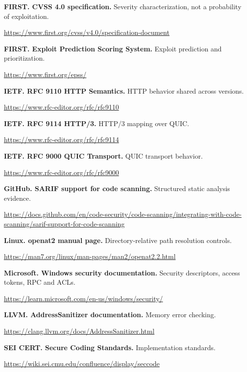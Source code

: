 \documentclass[10pt,letterpaper]{article}
\begin{document}
\noindent\textbf{FIRST. CVSS 4.0 specification.} Severity characterization, not a probability of exploitation.\par\small\url{https://www.first.org/cvss/v4.0/specification-document}\par\normalsize\medskip
\noindent\textbf{FIRST. Exploit Prediction Scoring System.} Exploit prediction and prioritization.\par\small\url{https://www.first.org/epss/}\par\normalsize\medskip
\noindent\textbf{IETF. RFC 9110 HTTP Semantics.} HTTP behavior shared across versions.\par\small\url{https://www.rfc-editor.org/rfc/rfc9110}\par\normalsize\medskip
\noindent\textbf{IETF. RFC 9114 HTTP/3.} HTTP/3 mapping over QUIC.\par\small\url{https://www.rfc-editor.org/rfc/rfc9114}\par\normalsize\medskip
\noindent\textbf{IETF. RFC 9000 QUIC Transport.} QUIC transport behavior.\par\small\url{https://www.rfc-editor.org/rfc/rfc9000}\par\normalsize\medskip
\noindent\textbf{GitHub. SARIF support for code scanning.} Structured static analysis evidence.\par\small\url{https://docs.github.com/en/code-security/code-scanning/integrating-with-code-scanning/sarif-support-for-code-scanning}\par\normalsize\medskip
\noindent\textbf{Linux. openat2 manual page.} Directory-relative path resolution controls.\par\small\url{https://man7.org/linux/man-pages/man2/openat2.2.html}\par\normalsize\medskip
\noindent\textbf{Microsoft. Windows security documentation.} Security descriptors, access tokens, RPC and ACLs.\par\small\url{https://learn.microsoft.com/en-us/windows/security/}\par\normalsize\medskip
\noindent\textbf{LLVM. AddressSanitizer documentation.} Memory error checking.\par\small\url{https://clang.llvm.org/docs/AddressSanitizer.html}\par\normalsize\medskip
\noindent\textbf{SEI CERT. Secure Coding Standards.} Implementation standards.\par\small\url{https://wiki.sei.cmu.edu/confluence/display/seccode}\par\normalsize\medskip
\end{document}
